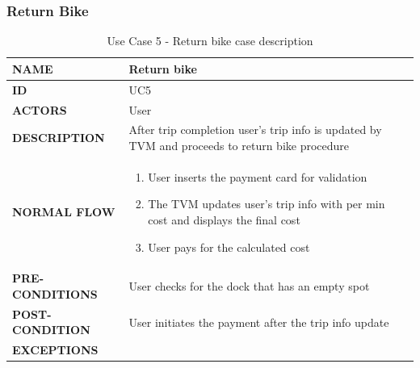 \subsubsection{Return Bike}
\begin{table}[H]
\begin{center}
\renewcommand{\arraystretch}{2}
\begin{tabular}{|p{8cm}|p{8cm}| } 
 \hline
 \textbf{NAME} & Return bike\\ 
 \hline
 \textbf{ID} & UC5\\ 
 \hline
 \textbf{ACTORS} & User\\
 \hline
 \textbf{DESCRIPTION} & After trip completion user's trip info is updated by TVM and proceeds to return bike procedure \\  
 \hline
 \textbf{NORMAL FLOW} & \begin{enumerate}
     \item User inserts the payment card for validation
     \item The TVM updates user's trip info with per min cost and displays the final cost
     \item User pays for the calculated cost
 \end{enumerate} \\
 \hline
 \textbf{PRE-CONDITIONS} & User checks for the dock that has an empty spot\\
 \hline
 \textbf{POST-CONDITION} & User initiates the payment after the trip info update\\
 \hline
 \textbf{EXCEPTIONS} & \\
 \hline
\end{tabular}
\caption{\label{demo-table}Use Case 5 - Return bike case description}
\end{center}
\end{table}

